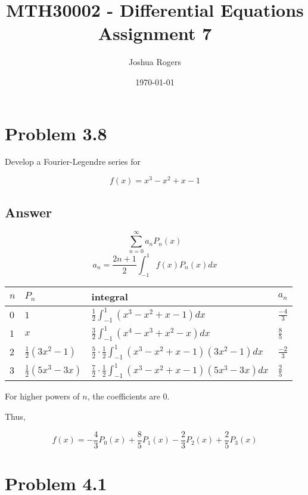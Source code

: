 \documentclass{article}
\title{\vspace{-4cm}MTH30002 - Differential Equations \\Assignment 7}
\author{Joshua Rogers}
\date\today
\begin{document}
\maketitle

\section*{Problem 3.8}

Develop a Fourier-Legendre series for

\begin{equation}\label{38A}
f(x) = x^3-x^2+x-1
\end{equation}


\subsection*{Answer}
$$ \sum_{n=0}^{\infty} a_n P_n (x) $$
$$ a_n = \frac{2n+1}{2} \int_{-1}^{1} f(x) P_n(x) dx $$

\begin{tabular}{
  |p{}
  |p{}
  |p{}
  |p{}|
  }
  \hline
  \centering $n$     & \centering $P_n$     & \centering integral & \centering\arraybackslash $a_n$     \\ \hline
  $0$ & $1$ & $\frac{1}{2} \int_{-1}^{1} \left(x^3-x^2+x-1\right) dx$ & $\frac{-4}{3}$ \\ \hline
  $1$ & $x$ & $\frac{3}{2} \int_{-1}^{1} \left(x^4-x^3+x^2-x\right) dx$ & $\frac{8}{5}$ \\ \hline
  $2$ & $\frac{1}{2} \left(3x^2-1\right)$ & $\frac{5}{2} \cdot \frac{1}{2} \int_{-1}^{1} \left(x^3-x^2+x-1\right)\left(3x^2-1\right) dx$ & $\frac{-2}{3}$ \\ \hline
  $3$ & $\frac{1}{2} \left(5x^3-3x\right)$ & $\frac{7}{2} \cdot \frac{1}{2} \int_{-1}^{1} \left(x^3-x^2+x-1\right)\left(5x^3-3x\right) dx$ & $\frac{2}{5}$ \\ \hline
\end{tabular}


For higher powers of $n$, the coefficients are 0.

Thus,

$$
f(x) = -\frac{4}{3} P_0(x) + \frac{8}{5} P_1(x) - \frac{2}{3} P_2(x) + \frac{2}{5} P_3(x)
$$



\section*{Problem 4.1}
\end{document}
